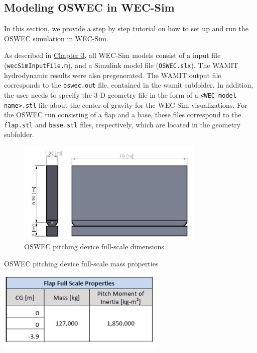 \subsection{Modeling OSWEC in WEC-Sim}
In this section, we provide a step by step tutorial on how to set up and run the OSWEC simulation in WEC-Sim. 

As described in \hyperlink{chapter.3}{Chapter 3}, all WEC-Sim models consist of a input file (\texttt{wecSimInputFile.m}), and a Simulink model file (\texttt{OSWEC.slx}). The WAMIT hydrodynamic results were also pregenerated. The WAMIT output file corresponds to the \texttt{oswec.out} file, contained in the wamit subfolder. In addition, the user needs to specify the 3-D geometry file in the form of a \texttt{<WEC model name>.stl} file about the center of gravity for the WEC-Sim visualizations. For the OSWEC run consisting of a flap and a base, these files correspond to the \texttt{flap.stl} and \texttt{base.stl} files, respectively, which are located in the geometry subfolder.

        \begin{figure}[H]
        \centering
        \includegraphics[width=0.8\textwidth]{application/images/OSWEC_Geom}
        \caption{OSWEC pitching device full-scale dimensions}
        \label{OSWEC_Geom}
        \end{figure}

        \begin{table}[H]
        \centering
        \caption{OSWEC pitching device full-scale mass properties}
        \includegraphics[width=0.6\textwidth]{application/images/OSWEC_MassProps}
        \label{OSWEC_MassProps}
        \end{table}
        
